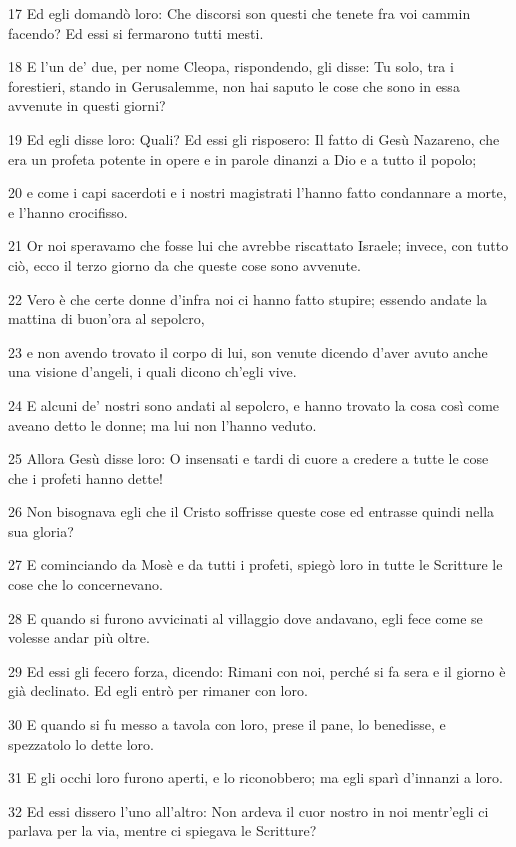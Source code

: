 \par 17 Ed egli domandò loro: Che discorsi son questi che tenete fra voi cammin facendo? Ed essi si fermarono tutti mesti.
\par 18 E l'un de' due, per nome Cleopa, rispondendo, gli disse: Tu solo, tra i forestieri, stando in Gerusalemme, non hai saputo le cose che sono in essa avvenute in questi giorni?
\par 19 Ed egli disse loro: Quali? Ed essi gli risposero: Il fatto di Gesù Nazareno, che era un profeta potente in opere e in parole dinanzi a Dio e a tutto il popolo;
\par 20 e come i capi sacerdoti e i nostri magistrati l'hanno fatto condannare a morte, e l'hanno crocifisso.
\par 21 Or noi speravamo che fosse lui che avrebbe riscattato Israele; invece, con tutto ciò, ecco il terzo giorno da che queste cose sono avvenute.
\par 22 Vero è che certe donne d'infra noi ci hanno fatto stupire; essendo andate la mattina di buon'ora al sepolcro,
\par 23 e non avendo trovato il corpo di lui, son venute dicendo d'aver avuto anche una visione d'angeli, i quali dicono ch'egli vive.
\par 24 E alcuni de' nostri sono andati al sepolcro, e hanno trovato la cosa così come aveano detto le donne; ma lui non l'hanno veduto.
\par 25 Allora Gesù disse loro: O insensati e tardi di cuore a credere a tutte le cose che i profeti hanno dette!
\par 26 Non bisognava egli che il Cristo soffrisse queste cose ed entrasse quindi nella sua gloria?
\par 27 E cominciando da Mosè e da tutti i profeti, spiegò loro in tutte le Scritture le cose che lo concernevano.
\par 28 E quando si furono avvicinati al villaggio dove andavano, egli fece come se volesse andar più oltre.
\par 29 Ed essi gli fecero forza, dicendo: Rimani con noi, perché si fa sera e il giorno è già declinato. Ed egli entrò per rimaner con loro.
\par 30 E quando si fu messo a tavola con loro, prese il pane, lo benedisse, e spezzatolo lo dette loro.
\par 31 E gli occhi loro furono aperti, e lo riconobbero; ma egli sparì d'innanzi a loro.
\par 32 Ed essi dissero l'uno all'altro: Non ardeva il cuor nostro in noi mentr'egli ci parlava per la via, mentre ci spiegava le Scritture?
